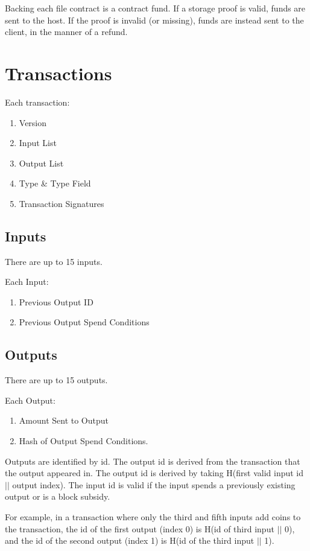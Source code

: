 \documentclass[twocolumn]{article}
\begin{document}
Backing each file contract is a contract fund.
If a storage proof is valid, funds are sent to the host.
If the proof is invalid (or missing), funds are instead sent to the client, in the manner of a refund.

\section{Transactions}
Each transaction:
\begin{enumerate}
	\item Version
	\item Input List
	\item Output List
	\item Type \& Type Field
	\item Transaction Signatures
\end{enumerate}

\subsection{Inputs}
There are up to 15 inputs.

Each Input:
\begin{enumerate}
	\item Previous Output ID
	\item Previous Output Spend Conditions
\end{enumerate}

\subsection{Outputs}
There are up to 15 outputs.

Each Output:
\begin{enumerate}
	\item Amount Sent to Output
	\item Hash of Output Spend Conditions.
\end{enumerate}

Outputs are identified by id.
The output id is derived from the transaction that the output appeared in.
The output id is derived by taking H(first valid input id $||$ output index).
The input id is valid if the input spends a previously existing output or is a block subsidy.

For example, in a transaction where only the third and fifth inputs add coins to the transaction, the id of the first output (index 0) is H(id of third input $||$ 0), and the id of the second output (index 1) is H(id of the third input $||$ 1).
\end{document}
